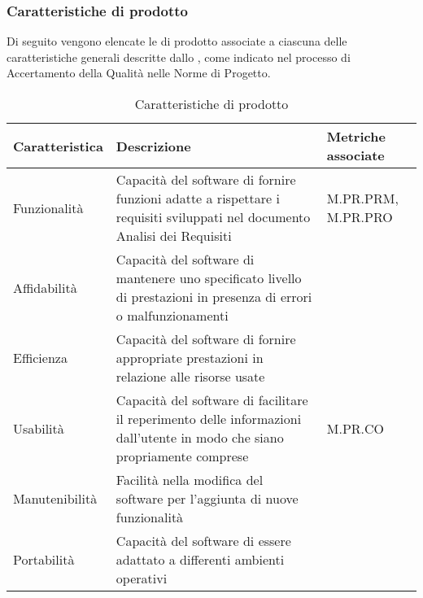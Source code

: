 \subsubsection{Caratteristiche di prodotto}
Di seguito vengono elencate le  di prodotto associate a ciascuna delle caratteristiche generali descritte dallo , 
come indicato nel processo di Accertamento della Qualità nelle Norme di Progetto.
\begin{table}[H]
    \centering
    \begin{tabularx}{\textwidth}{| X | X | X |}
    \hline
        \textbf{Caratteristica} & 
        \textbf{Descrizione} &
        \textbf{Metriche associate}\\
    \hline
        Funzionalità & Capacità del software di fornire funzioni adatte a rispettare i requisiti sviluppati nel documento Analisi dei Requisiti & M.PR.PRM, M.PR.PRO \\
    \hline
        Affidabilità & Capacità del software di mantenere uno specificato livello di prestazioni in presenza di errori o malfunzionamenti & \\
    \hline
        Efficienza & Capacità del software di fornire appropriate prestazioni in relazione alle risorse usate & \\
    \hline
        Usabilità & Capacità del software di facilitare il reperimento delle informazioni dall'utente in modo che siano propriamente comprese & M.PR.CO \\
    \hline
        Manutenibilità & Facilità nella modifica del software per l'aggiunta di nuove funzionalità & \\
    \hline
        Portabilità & Capacità del software di essere adattato a differenti ambienti operativi & \\
    \hline
    \end{tabularx}
    \caption{Caratteristiche di prodotto}
    \label{tab:caratteristiche_prodotto} 
\end{table}





